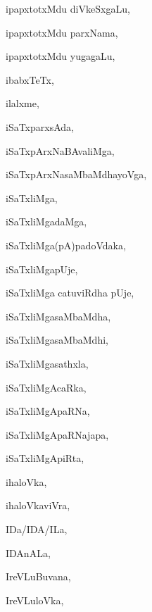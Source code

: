 \begin{multicols}{3}
{\noindent
{ipapxtotxMdu diVkeSxgaLu}, \pageref{ipapxtotxMdu diVkeSxgaLu}

\noindent
{ipapxtotxMdu parxNama}, \pageref{ipapxtotxMdu parxNama}

\noindent
{ipapxtotxMdu yugagaLu}, \pageref{ipapxtotxMdu yugagaLu}

\noindent
{ibabxTeTx}, \pageref{ibabxTeTx}

\noindent
{ilalxme}, \pageref{ilalxme}

\noindent
{iSaTxparxsAda}, \pageref{iSaTxparxsAda}

\noindent
{iSaTxpArxNaBAvaliMga}, \pageref{iSaTxpArxNaBAvaliMga}

\noindent
{iSaTxpArxNasaMbaMdhayoVga}, \pageref{iSaTxpArxNasaMbaMdhayoVga}

\noindent
{iSaTxliMga}, \pageref{iSaTxliMga}

\noindent
{iSaTxliMgadaMga}, \pageref{iSaTxliMgadaMga}

\noindent
{iSaTxliMga(pA)padoVdaka}, \pageref{iSaTxliMga(pA)padoVdaka}

\noindent
{iSaTxliMgapUje}, \pageref{iSaTxliMgapUje}

\noindent
{iSaTxliMga catuviRdha pUje}, \pageref{iSaTxliMga catuviRdha pUje}

\noindent
{iSaTxliMgasaMbaMdha}, \pageref{iSaTxliMgasaMbaMdha}

\noindent
{iSaTxliMgasaMbaMdhi}, \pageref{iSaTxliMgasaMbaMdhi}

\noindent
{iSaTxliMgasathxla}, \pageref{iSaTxliMgasathxla}

\noindent
{iSaTxliMgAcaRka}, \pageref{iSaTxliMgAcaRka}

\noindent
{iSaTxliMgApaRNa}, \pageref{iSaTxliMgApaRNa}

\noindent
{iSaTxliMgApaRNajapa}, \pageref{iSaTxliMgApaRNajapa}

\noindent
{iSaTxliMgApiRta}, \pageref{iSaTxliMgApiRta}

\noindent
{ihaloVka}, \pageref{ihaloVka}

\noindent
{ihaloVkaviVra}, \pageref{ihaloVkaviVra}

\bigskip
\noindent
{}
\smallskip

\noindent
{IDa/IDA/ILa}, \pageref{IDa/IDA/ILa}

\noindent
{IDAnALa}, \pageref{IDAnALa}

\noindent
{IreVLuBuvana}, \pageref{IreVLuBuvana}

\noindent
{IreVLuloVka}, \pageref{IreVLuloVka}

}
\end{multicols}
